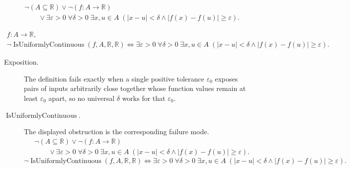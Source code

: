 \begin{remark*}
\[
\begin{aligned}
&\neg(A\subseteq\mathbb{R})\lor\neg(f:A\to\mathbb{R})\\
&\qquad\lor\exists \varepsilon > 0 \; \forall \delta > 0 \; \exists x,u \in A \; (|x-u| < \delta \land |f(x)-f(u)| \ge \varepsilon).
\end{aligned}
\]
\end{remark*}

\begin{remark*}
\[
\begin{aligned}
  f\colon A\to\mathbb{R},\\
\neg \operatorname{IsUniformlyContinuous}(f,A,\mathbb R,\mathbb R)
\Longleftrightarrow
\exists \varepsilon > 0 \; \forall \delta > 0 \; \exists x,u \in A \;
(|x-u| < \delta \land |f(x)-f(u)| \ge \varepsilon).
\end{aligned}
\]
\end{remark*}

\begin{remark*}
\begin{description}
  \item[Exposition.]
The definition fails exactly when a single positive tolerance $\varepsilon_{0}$ exposes pairs of inputs arbitrarily close together whose function values remain at least $\varepsilon_{0}$ apart, so no universal $\delta$ works for that $\varepsilon_{0}$.


  \item[\(\operatorname{IsUniformlyContinuous}.\)]
  The displayed obstruction is the corresponding failure mode.
  \[
\begin{aligned}
&\neg(A\subseteq\mathbb{R})\lor\neg(f:A\to\mathbb{R})\\
&\qquad\lor\exists \varepsilon > 0 \; \forall \delta > 0 \; \exists x,u \in A \; (|x-u| < \delta \land |f(x)-f(u)| \ge \varepsilon).
\end{aligned}
  \]
  \[
\neg \operatorname{IsUniformlyContinuous}(f,A,\mathbb R,\mathbb R)
\Longleftrightarrow
\exists \varepsilon > 0 \; \forall \delta > 0 \; \exists x,u \in A \;
(|x-u| < \delta \land |f(x)-f(u)| \ge \varepsilon).
  \]
\end{description}
\end{remark*}

